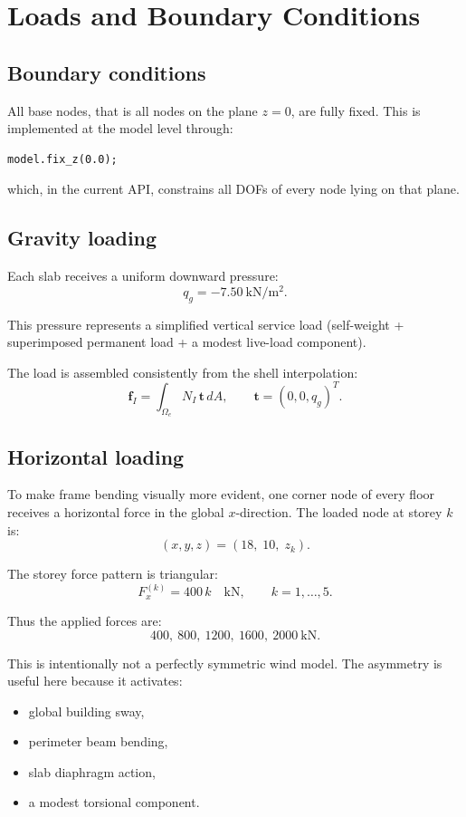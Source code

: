 \section{Loads and Boundary Conditions}

\subsection{Boundary conditions}

All base nodes, that is all nodes on the plane \(z=0\), are fully fixed.
This is implemented at the model level through:
\begin{verbatim}
model.fix_z(0.0);
\end{verbatim}
which, in the current API, constrains all DOFs of every node lying on that
plane.

\subsection{Gravity loading}

Each slab receives a uniform downward pressure:
\[
q_g = -7.50\ \mathrm{kN/m^2}.
\]

This pressure represents a simplified vertical service load
(self-weight + superimposed permanent load + a modest live-load component).

The load is assembled consistently from the shell interpolation:
\[
\mathbf{f}_I = \int_{\Omega_e} N_I\,\mathbf{t}\,dA,
\qquad
\mathbf{t} = (0,0,q_g)^T.
\]

\subsection{Horizontal loading}

To make frame bending visually more evident, one corner node of every floor
receives a horizontal force in the global \(x\)-direction. The loaded node at
storey \(k\) is:
\[
(x,y,z) = (18,\; 10,\; z_k).
\]

The storey force pattern is triangular:
\[
F_x^{(k)} = 400\,k \quad \mathrm{kN},
\qquad
k = 1,\dots,5.
\]

Thus the applied forces are:
\[
400,\ 800,\ 1200,\ 1600,\ 2000\ \mathrm{kN}.
\]

This is intentionally not a perfectly symmetric wind model. The asymmetry is
useful here because it activates:
\begin{itemize}
  \item global building sway,
  \item perimeter beam bending,
  \item slab diaphragm action,
  \item a modest torsional component.
\end{itemize}

